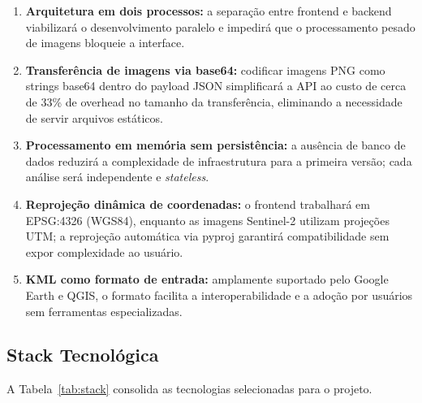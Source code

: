 \documentclass[12pt, a4paper]{article}
\begin{document}
\begin{enumerate}
  \item \textbf{Arquitetura em dois processos:} a separação entre frontend e backend viabilizará o desenvolvimento paralelo e impedirá que o processamento pesado de imagens bloqueie a interface.
  \item \textbf{Transferência de imagens via base64:} codificar imagens PNG como strings base64 dentro do payload JSON simplificará a API ao custo de cerca de 33\% de overhead no tamanho da transferência, eliminando a necessidade de servir arquivos estáticos.
  \item \textbf{Processamento em memória sem persistência:} a ausência de banco de dados reduzirá a complexidade de infraestrutura para a primeira versão; cada análise será independente e \textit{stateless}.
  \item \textbf{Reprojeção dinâmica de coordenadas:} o frontend trabalhará em EPSG:4326 (WGS84), enquanto as imagens Sentinel-2 utilizam projeções UTM; a reprojeção automática via pyproj garantirá compatibilidade sem expor complexidade ao usuário.
  \item \textbf{KML como formato de entrada:} amplamente suportado pelo Google Earth e QGIS, o formato facilita a interoperabilidade e a adoção por usuários sem ferramentas especializadas.
\end{enumerate}

\subsection{Stack Tecnológica}

A Tabela~\ref{tab:stack} consolida as tecnologias selecionadas para o projeto.
\end{document}
